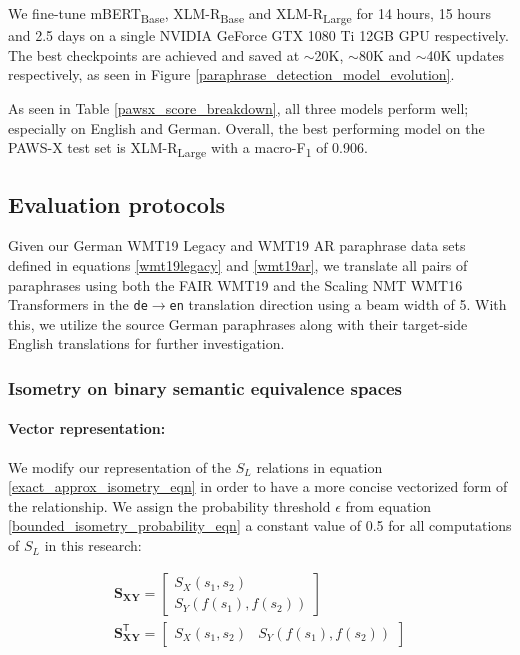 \documentclass[11pt,a4paper]{article}
\begin{document}
We fine-tune mBERT\textsubscript{Base}, XLM-R\textsubscript{Base} and XLM-R\textsubscript{Large} for 14 hours, 15 hours and 2.5 days on a single NVIDIA GeForce GTX 1080 Ti 12GB GPU respectively. The best checkpoints are achieved and saved at $\sim$20K, $\sim$80K and $\sim$40K updates respectively, as seen in Figure \ref{paraphrase_detection_model_evolution}.

As seen in Table \ref{pawsx_score_breakdown}, all three models perform well; especially on English and German. Overall, the best performing model on the PAWS-X test set is XLM-R\textsubscript{Large} with a macro-F\textsubscript{1} of 0.906.

\subsection{Evaluation protocols}

Given our German WMT19 Legacy and WMT19 AR paraphrase data sets defined in equations \ref{wmt19legacy} and \ref{wmt19ar}, we translate all pairs of paraphrases using both the FAIR WMT19 and the Scaling NMT WMT16 Transformers in the \texttt{de$\rightarrow$en} translation direction using a beam width of 5. With this, we utilize the source German paraphrases along with their target-side English translations for further investigation. 

\subsubsection{Isometry on binary semantic equivalence spaces}

\paragraph{Vector representation:} We modify our representation of the $S_L$ relations in equation \ref{exact_approx_isometry_eqn} in order to have a more concise vectorized form of the relationship. We assign the probability threshold $\epsilon$ from equation \ref{bounded_isometry_probability_eqn} a constant value of 0.5 for all computations of $S_L$ in this research:

\vspace{-5pt}
\begin{gather}
  \mathbf{S_{XY}} = \begin{bmatrix} S_X(s_1, s_2) \\[5pt] S_Y(f(s_1), f(s_2)) \end{bmatrix} \\[10pt] 
  \mathbf{S_{XY}^{\mathsf{T}}} = \begin{bmatrix} S_X(s_1, s_2) & S_Y(f(s_1), f(s_2)) \end{bmatrix}
\end{gather}
\end{document}
